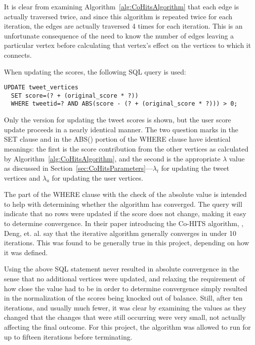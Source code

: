 It is clear from examining Algorithm~\ref{alg:CoHitsAlgorithm} that each edge is actually traversed twice, and since this algorithm is repeated twice for each iteration, the edges are actually traversed 4 times for each iteration. This is an unfortunate consequence of the need to know the number of edges leaving a particular vertex before calculating that vertex's effect on the vertices to which it connects.

When updating the scores, the following SQL query is used:

\begin{verbatim}
UPDATE tweet_vertices
  SET score=(? + (original_score * ?))
  WHERE tweetid=? AND ABS(score - (? + (original_score * ?))) > 0;
\end{verbatim}

\noindent
Only the version for updating the tweet scores is shown, but the user score update proceeds in a nearly identical manner. The two question marks in the SET clause and in the ABS() portion of the WHERE clause have identical meanings: the first is the score contribution from the other vertices as calculated by Algorithm~\ref{alg:CoHitsAlgorithm}, and the second is the appropriate $\lambda$ value as discussed in Section~\ref{sec:CoHitsParameters}---$\lambda_{t}$ for updating the tweet vertices and $\lambda_{u}$ for updating the user vertices.

The part of the WHERE clause with the check of the absolute value is intended to help with determining whether the algorithm has converged. The query will indicate that no rows were updated if the score does not change, making it easy to determine convergence. In their paper introducing the Co-HITS algorithm, \cite{Deng2009}, Deng, et. al. say that the iterative algorithm generally converges in under 10 iterations. This was found to be generally true in this project, depending on how it was defined.

Using the above SQL statement never resulted in absolute convergence in the sense that no additional vertices were updated, and relaxing the requirement of how close the value had to be in order to determine convergence simply resulted in the normalization of the scores being knocked out of balance. Still, after ten iterations, and usually much fewer, it was clear by examining the values as they changed that the changes that were still occurring were very small, not actually affecting the final outcome. For this project, the algorithm was allowed to run for up to fifteen iterations before terminating.

